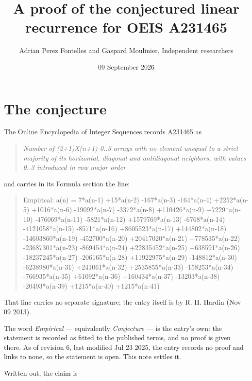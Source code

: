 \documentclass[11pt]{article}
\title{A proof of the conjectured linear recurrence for OEIS A231465}
\author{Adrian Perez Fontelles and Gaspard Moulinier, Independent researchers}
\date{09 September 2026}
\theoremstyle{definition}
\begin{document}
\maketitle
\section{The conjecture}

The Online Encyclopedia of Integer Sequences records \href{https://oeis.org/A231465}{A231465} as

\begin{quote}\itshape Number of (2+1)X(n+1) 0..3 arrays with no element unequal to a strict majority of its horizontal, diagonal and antidiagonal neighbors, with values 0..3 introduced in row major order\end{quote}

and carries in its Formula section the line:

\begin{quote}\ttfamily Empirical: a(n) = 7*a(n-1) +15*a(n-2) -167*a(n-3) -164*a(n-4) +2252*a(n-5) +1016*a(n-6) -19092*a(n-7) -3372*a(n-8) +110426*a(n-9) +7229*a(n-10) -476069*a(n-11) -5821*a(n-12) +1579769*a(n-13) -6768*a(n-14) -4121058*a(n-15) -8571*a(n-16) +8605523*a(n-17) +144802*a(n-18) -14603860*a(n-19) -452700*a(n-20) +20417020*a(n-21) +778535*a(n-22) -23687301*a(n-23) -869454*a(n-24) +22835452*a(n-25) +638591*a(n-26) -18237245*a(n-27) -206165*a(n-28) +11922975*a(n-29) -148812*a(n-30) -6238980*a(n-31) +241061*a(n-32) +2535855*a(n-33) -158253*a(n-34) -766935*a(n-35) +61092*a(n-36) +160434*a(n-37) -13203*a(n-38) -20493*a(n-39) +1215*a(n-40) +1215*a(n-41)\end{quote}

That line carries no separate signature; the entry itself is by R. H. Hardin (Nov 09 2013).

The word {\itshape Empirical} --- equivalently {\itshape Conjecture} --- is the entry's own: the statement is recorded as fitted to the published terms, and no proof is given there. As of revision 6, last modified Jul 23 2025, the entry records no proof and links to none, so the statement is open. This note settles it.

Written out, the claim is
\end{document}
